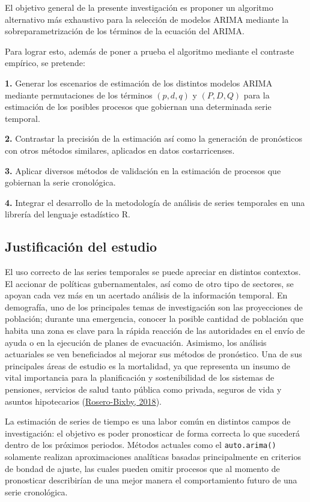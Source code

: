 \documentclass[
]{article}
\begin{document}
El objetivo general de la presente investigación es proponer un
algoritmo alternativo más exhaustivo para la selección de modelos ARIMA
mediante la sobreparametrización de los términos de la ecuación del
ARIMA.

Para lograr esto, además de poner a prueba el algoritmo mediante el
contraste empírico, se pretende:

\textbf{1.} Generar los escenarios de estimación de los distintos
modelos ARIMA mediante permutaciones de los términos \((p,d,q)\) y
\((P,D,Q)\) para la estimación de los posibles procesos que gobiernan
una determinada serie temporal.

\textbf{2.} Contrastar la precisión de la estimación así como la
generación de pronósticos con otros métodos similares, aplicados en
datos costarricenses.

\textbf{3.} Aplicar diversos métodos de validación en la estimación de
procesos que gobiernan la serie cronológica.

\textbf{4.} Integrar el desarrollo de la metodología de análisis de
series temporales en una librería del lenguaje estadístico R.

\subsection{Justificación del estudio}

El uso correcto de las series temporales se puede apreciar en distintos
contextos. El accionar de políticas gubernamentales, así como de otro
tipo de sectores, se apoyan cada vez más en un acertado análisis de la
información temporal. En demografía, uno de los principales temas de
investigación son las proyecciones de población; durante una emergencia,
conocer la posible cantidad de población que habita una zona es clave
para la rápida reacción de las autoridades en el envío de ayuda o en la
ejecución de planes de evacuación. Asimismo, los análisis actuariales se
ven beneficiados al mejorar sus métodos de pronóstico. Una de sus
principales áreas de estudio es la mortalidad, ya que representa un
insumo de vital importancia para la planificación y sostenibilidad de
los sistemas de pensiones, servicios de salud tanto pública como
privada, seguros de vida y asuntos hipotecarios
(\protect\hyperlink{ref-supenprodc}{Rosero-Bixby, 2018}).

La estimación de series de tiempo es una labor común en distintos campos
de investigación: el objetivo es poder pronosticar de forma correcta lo
que sucederá dentro de los próximos periodos. Métodos actuales como el
\texttt{auto.arima()} solamente realizan aproximaciones analíticas
basadas principalmente en criterios de bondad de ajuste, las cuales
pueden omitir procesos que al momento de pronosticar describirían de una
mejor manera el comportamiento futuro de una serie cronológica.
\end{document}
